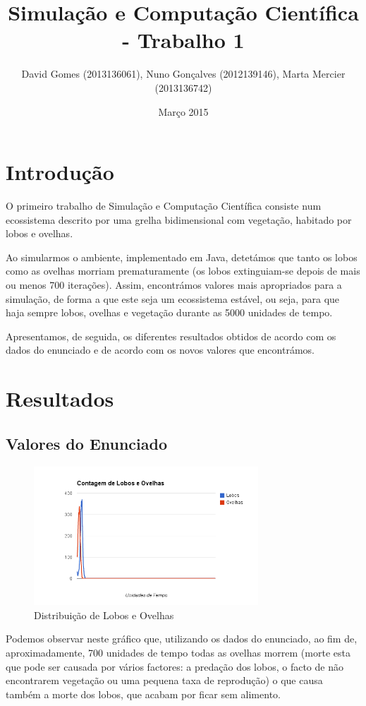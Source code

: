 \documentclass[12pt]{article}
\title{Simulação e Computação Científica - Trabalho 1}
\author{David Gomes (2013136061), Nuno Gonçalves (2012139146), Marta Mercier (2013136742)}
\date{Março 2015}
\begin{document}
\maketitle

\section*{Introdução}
O primeiro trabalho de Simulação e Computação Científica consiste num ecossistema
descrito por uma grelha bidimensional com vegetação, habitado por lobos e ovelhas.

Ao simularmos o ambiente, implementado em Java, detetámos que tanto os lobos como
as ovelhas morriam prematuramente (os lobos extinguiam-se depois de mais ou menos
700 iterações). Assim, encontrámos valores mais apropriados para a simulação, de
forma a que este seja um ecossistema estável, ou seja, para que haja sempre lobos, ovelhas e vegetação durante as 5000 unidades de tempo.

Apresentamos, de seguida, os diferentes resultados obtidos de acordo com os dados do
enunciado e de acordo com os novos valores que encontrámos.

\section*{Resultados}
\subsection{Valores do Enunciado}

\begin{figure}[H]
  \centering
  \includegraphics[width=0.75\textwidth]{ovelhaslobos1}
  \caption{Distribuição de Lobos e Ovelhas}
\end{figure}

Podemos observar neste gráfico que, utilizando os dados do enunciado, ao fim de, aproximadamente, 700 unidades de tempo todas as ovelhas morrem (morte esta que pode ser causada por vários factores: a predação dos lobos, o facto de não encontrarem vegetação ou uma pequena taxa de reprodução) o que causa também a morte dos lobos, que acabam por ficar sem alimento.
\end{document}
